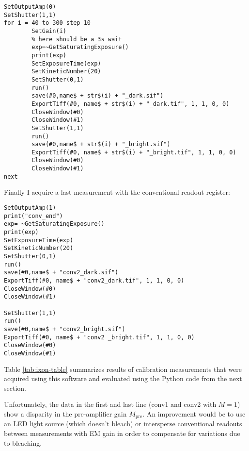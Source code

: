 \begin{lstlisting}[style=mybasic]
SetOutputAmp(0)
SetShutter(1,1)
for i = 40 to 300 step 10
        SetGain(i)
        % here should be a 3s wait
        exp=~GetSaturatingExposure()
        print(exp)
        SetExposureTime(exp)
        SetKineticNumber(20)
        SetShutter(0,1)
        run()
        save(#0,name$ + str$(i) + "_dark.sif")
        ExportTiff(#0, name$ + str$(i) + "_dark.tif", 1, 1, 0, 0)
        CloseWindow(#0)
        CloseWindow(#1)
        SetShutter(1,1)
        run()
        save(#0,name$ + str$(i) + "_bright.sif")
        ExportTiff(#0, name$ + str$(i) + "_bright.tif", 1, 1, 0, 0)
        CloseWindow(#0)
        CloseWindow(#1)
next
\end{lstlisting}
Finally I acquire a last measurement with the conventional readout
register: \begin{lstlisting}[style=mybasic]
SetOutputAmp(1)
print("conv_end")
exp= ~GetSaturatingExposure()
print(exp)
SetExposureTime(exp)
SetKineticNumber(20)
SetShutter(0,1)
run()
save(#0,name$ + "conv2_dark.sif")
ExportTiff(#0, name$ + "conv2_dark.tif", 1, 1, 0, 0)
CloseWindow(#0)
CloseWindow(#1)
        
SetShutter(1,1)
run()
save(#0,name$ + "conv2_bright.sif")
ExportTiff(#0, name$ + "conv2 _bright.tif", 1, 1, 0, 0)
CloseWindow(#0)
CloseWindow(#1)
\end{lstlisting}
Table \ref{tab:ixon-table} summarizes results of calibration
measurements that were acquired using this software and evaluated
using the Python code from the next section.

Unfortunately, the data in the first and last line (conv1 and conv2
with $M=1$) show a disparity in the pre-amplifier gain
$M_\textrm{pre}$. An improvement would be to use an LED light source
(which doesn't bleach) or intersperse conventional readouts between
measurements with EM gain in order to compensate for variations due to
bleaching.



